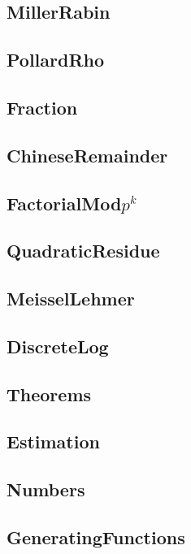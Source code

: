	\subsection{MillerRabin}
	
	\subsection{PollardRho}
	
	\subsection{Fraction}
	
	\subsection{ChineseRemainder}
	
	\subsection{FactorialMod$p^k$}
	
	\subsection{QuadraticResidue}
	
	\subsection{MeisselLehmer}
	
	\subsection{DiscreteLog}
	
	\subsection{Theorems}
	
	\subsection{Estimation}
	
	\subsection{Numbers}
	
	\subsection{GeneratingFunctions}
	
